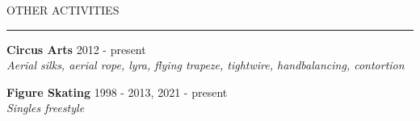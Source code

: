 \documentclass{resume} %
\renewenvironment{rSection}[1]{
\sectionskip
\textcolor{RoyalPurple}{\MakeUppercase{#1}}
\sectionlineskip
\hrule
\begin{list}{}{
\setlength{\leftmargin}{1.5em}
}
\item[]
}{
\end{list}
}
\begin{document}

\begin{rSection}{Other Activities}

{\bf Circus Arts} \hfill 2012 - present \\ 
{\em Aerial silks, aerial rope, lyra, flying trapeze, tightwire, handbalancing, contortion} 

{\bf Figure Skating} \hfill 1998 - 2013, 2021 - present \\ 
{\em Singles freestyle} 

\end{rSection}
\end{document}
